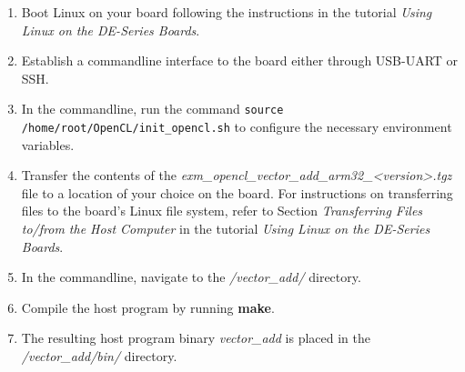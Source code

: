 \documentclass[11pt, twoside, pdftex]{article}
\begin{document}
\begin{enumerate}
\item Boot Linux on your board following the instructions in the tutorial \textit{Using Linux on the DE-Series Boards}.
\item Establish a commandline interface to the board either through USB-UART or SSH.
\item In the commandline, run the command \texttt{source /home/root/OpenCL/init\_opencl.sh} to configure the necessary environment variables.
\item Transfer the contents of the \textit{exm\_opencl\_vector\_add\_arm32\_<version>.tgz} file to a location of your choice on the board. For instructions on transferring files to the board's Linux file system, refer to Section \textit{Transferring Files to/from the Host Computer} in the tutorial \textit{Using Linux on the DE-Series Boards}.
\item In the commandline, navigate to the \textit{/vector\_add/} directory.
\item Compile the host program by running \textbf{make}. 
\item The resulting host program binary \textit{vector\_add} is placed in the \textit{/vector\_add/bin/} directory.
\end{enumerate}



\end{document}
